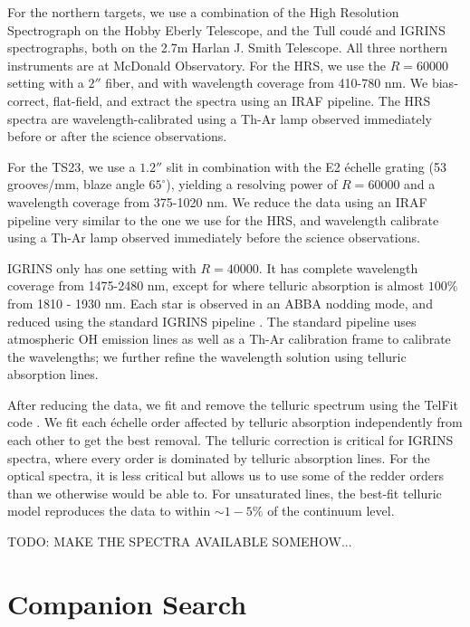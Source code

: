 \documentclass{emulateapj}
\begin{document}
For the northern targets, we use a combination of the High Resolution Spectrograph \citep[HRS,][]{HRS} on the Hobby Eberly Telescope, and the Tull coud\'e \citep[TS23,][]{TS23} and IGRINS \citep{IGRINS} spectrographs, both on the 2.7m Harlan J. Smith Telescope. All three northern instruments are at McDonald Observatory. For the HRS, we use the $R = 60000$ setting with a $2''$ fiber, and with wavelength coverage from 410-780 nm. We bias-correct, flat-field, and extract the spectra using an IRAF pipeline. The HRS spectra are wavelength-calibrated using a Th-Ar lamp observed immediately before or after the science observations.

For the TS23, we use a $1.2''$ slit in combination with the E2 \'echelle grating (53 grooves/mm, blaze angle $65^{\circ}$), yielding a resolving power of $R=60000$ and a wavelength coverage from 375-1020 nm. We reduce the data using an IRAF pipeline very similar to the one we use for the HRS, and wavelength calibrate using a Th-Ar lamp observed immediately before the science observations.

IGRINS only has one setting with $R = 40000$. It has complete wavelength coverage from 1475-2480 nm, except for where telluric absorption is almost $100\%$ from 1810 - 1930 nm. Each star is observed in an ABBA nodding mode, and reduced using the standard IGRINS pipeline \citep{IGRINS_plp_v2}. The standard pipeline uses atmospheric OH emission lines as well as a Th-Ar calibration frame to calibrate the wavelengths; we further refine the wavelength solution using telluric absorption lines.

After reducing the data, we fit and remove the telluric spectrum using the TelFit code \citep{Gullikson2014}. We fit each \'echelle order affected by telluric absorption independently from each other to get the best removal. The telluric correction is critical for IGRINS spectra, where every order is dominated by telluric absorption lines. For the optical spectra, it is less critical but allows us to use some of the redder orders than we otherwise would be able to. For unsaturated lines, the best-fit telluric model reproduces the data to within $\sim 1-5\%$ of the continuum level.

TODO: MAKE THE SPECTRA AVAILABLE SOMEHOW...


\section{Companion Search}
\label{sec:companions}
\end{document}

